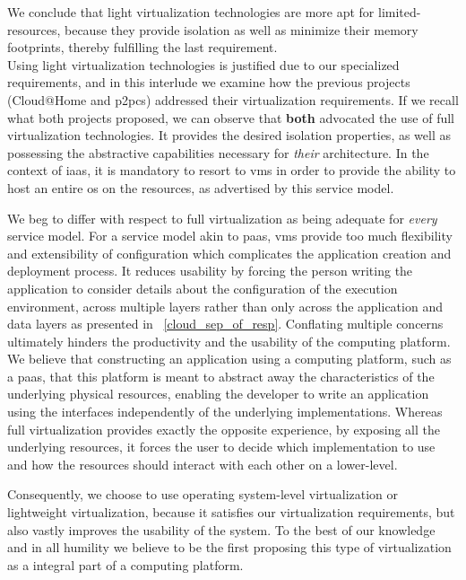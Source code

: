 \documentclass[12pt, titlepage]{uo_temp}
\begin{document}
     We conclude that light virtualization technologies are more apt for
     limited-resources, because they provide isolation as well as minimize their memory
     footprints, thereby fulfilling the last requirement.\\

     Using light virtualization technologies is justified due to our specialized
     requirements, and in this interlude we examine how the previous projects (Cloud@Home
     and \gls{p2pcs}) addressed their virtualization requirements.
     If we recall what both projects proposed, we can observe that \textbf{both} advocated
     the use of full virtualization technologies. It provides the desired isolation
     properties, as well as possessing the abstractive capabilities necessary for
     \emph{their} architecture. In the context of \gls{iaas}, it is mandatory to
     resort to \gls{vm}s in order to provide the ability to host an entire
     \gls{os} on the resources, as advertised by this service model.

     We beg to differ with respect to full virtualization as being adequate for
     \emph{every} service model. For a service model akin to \gls{paas}, \gls{vm}s provide
     too much flexibility and extensibility of configuration which complicates the
     application creation and deployment process. It reduces usability by forcing the
     person writing the application to consider details about the configuration of the
     execution environment, across multiple layers rather than only across the application
     and data layers as presented in ~\ref{cloud_sep_of_resp}. Conflating multiple
     concerns ultimately hinders the productivity and the usability of the computing
     platform. We believe that constructing an application using a computing platform,
     such as a \gls{paas}, that this platform is meant to abstract away the
     characteristics of the underlying physical resources, enabling the developer to write
     an application using the interfaces independently of the underlying
     implementations. Whereas full virtualization provides exactly the opposite
     experience, by exposing all the underlying resources, it forces the user to decide
     which implementation to use and how the resources should interact with each other on
     a lower-level.

     Consequently, we choose to use operating system-level virtualization or lightweight
     virtualization, because it satisfies our virtualization requirements, but also vastly
     improves the usability of the system. To the best of our knowledge and in all
     humility we believe to be the first proposing this type of virtualization as a
     integral part of a computing platform.
    
\end{document}
